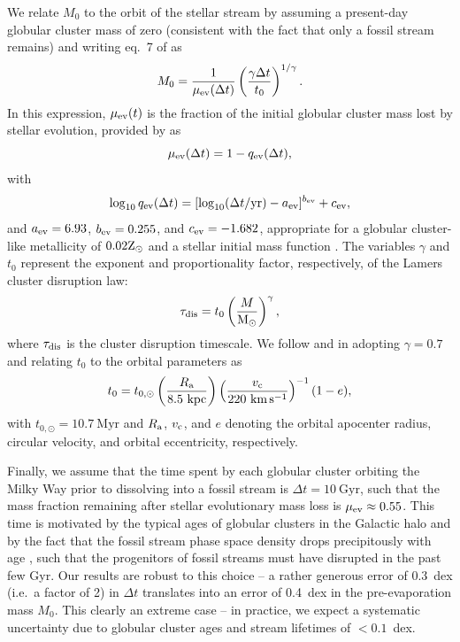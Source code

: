 \documentclass[twocolumn]{aastex63}
\newcommand{\msun}{\ensuremath{\textrm{M}_\odot}}
\newcommand{\myr}{\ensuremath{\textrm{Myr}}}
\newcommand{\gyr}{\ensuremath{\textrm{Gyr}}}
\newcommand{\kpc}{\ensuremath{\textrm{kpc}}}
\newcommand{\kms}{\ensuremath{\textrm{km}\,\textrm{s}^{-1}}}
\begin{document}
We relate $M_0$ to the orbit of the stellar stream by assuming a present-day globular cluster mass of zero (consistent with the fact that only a fossil stream remains) and writing eq.~7 of \citet{lamers05} as
\begin{equation}
\label{eq:m0}
M_{\rm 0}=\frac{1}{\mu_{\rm ev}(\Delta t)}\left(\frac{\gamma \Delta t}{t_0}\right)^{1/\gamma} .
\end{equation}
In this expression, $\mu_{\rm ev}(t)$ is the fraction of the initial globular cluster mass lost by stellar evolution, provided by \citet{lamers05} as
\begin{equation}
\label{eq:muev}
\mu_{\rm ev}(\Delta t)=1-q_{\rm ev}(\Delta t) ,
\end{equation}
with
\begin{equation}
\label{eq:qev}
\log_{10}{q_{\rm ev}}(\Delta t) = [\log_{10}(\Delta t/{\rm yr})-a_{\rm ev}]^{b_{\rm ev}}+c_{\rm ev} ,
\end{equation}
and $a_{\rm ev} = 6.93$, $b_{\rm ev} = 0.255$, and $c_{\rm ev} = -1.682$, appropriate for a globular cluster-like metallicity of $0.02{\rm Z}_\odot$ and a \citet{kroupa01} stellar initial mass function \citep{kruijssen08}. The variables $\gamma$ and $t_0$ represent the exponent and proportionality factor, respectively, of the Lamers cluster disruption law:
\begin{equation}
\label{eq:lamers}
\tau_{\rm dis}=t_0\left(\frac{M}{\msun}\right)^\gamma ,
\end{equation}
where $\tau_{\rm dis}$ is the cluster disruption timescale. We follow \citet{kruijssen09} and \citet{lamers:2010} in adopting $\gamma=0.7$ and relating $t_0$ to the orbital parameters as
\begin{equation}
\label{eq:t0}
t_0 = t_{0,\odot}\left(\frac{R_{\rm a}}{8.5~\kpc}\right)\left(\frac{v_{\rm c}}{220~\kms}\right)^{-1}(1-e) ,
\end{equation}
with $t_{0,\odot}=10.7~\myr$ and $R_{\rm a}$, $v_{\rm c}$, and $e$ denoting the orbital apocenter radius, circular velocity, and orbital eccentricity, respectively. 

Finally, we assume that the time spent by each globular cluster orbiting the Milky Way prior to dissolving into a fossil stream is $\Delta t=10~\gyr$, such that the mass fraction remaining after stellar evolutionary mass loss is $\mu_{\rm ev}\approx0.55$. This time is motivated by the typical ages of globular clusters in the Galactic halo \citep[$\sim12~\gyr$, e.g.][]{kruijssen19e} and by the fact that the fossil stream phase space density drops precipitously with age \citep{helmi:1999}, such that the progenitors of fossil streams must have disrupted in the past few Gyr. Our results are robust to this choice -- a rather generous error of 0.3~dex (i.e.\ a factor of 2) in $\Delta t$ translates into an error of 0.4~dex in the pre-evaporation mass $M_0$. This clearly an extreme case \citep[e.g.][]{marinfranch09,forbes10,dotter10,dotter11,vandenberg13,kruijssen19e} -- in practice, we expect a systematic uncertainty due to globular cluster ages and stream lifetimes of $<0.1$~dex.
\end{document}
